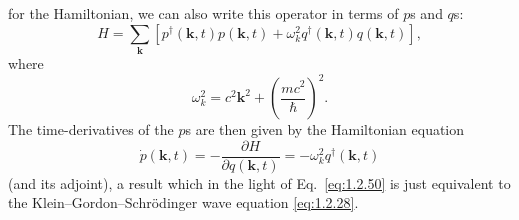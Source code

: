 for the Hamiltonian, we can also write this operator in terms of $p$s and
$q$s:
\begin{equation}
  H=\sum_{\mathbf k}\left[
    p^{\dagger}(\mathbf k,t)p(\mathbf k,t)
    +\omega_k^2q^{\dagger}(\mathbf k,t)q(\mathbf k,t)
  \right],
  \tag{1.2.55}\label{eq:1.2.55}
\end{equation}
where
\begin{equation}
  \omega_k^2=c^2\mathbf k^2+\left(\frac{mc^2}{\hbar}\right)^2.
  \tag{1.2.56}\label{eq:1.2.56}
\end{equation}
The time-derivatives of the $p$s are then given by the Hamiltonian equation
\begin{equation}
  \dot p(\mathbf k,t)=-\frac{\partial H}{\partial q(\mathbf k,t)}
  =-\omega_k^2q^{\dagger}(\mathbf k,t)
  \tag{1.2.57}\label{eq:1.2.57}
\end{equation}
(and its adjoint), a result which in the light of Eq.~\eqref{eq:1.2.50} is just
equivalent to the Klein--Gordon--Schr\"odinger wave equation \eqref{eq:1.2.28}.

